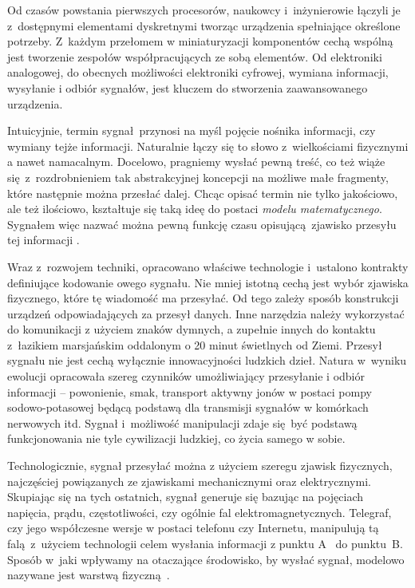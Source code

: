 Od czasów powstania pierwszych procesorów, naukowcy i~inżynierowie łączyli
je z~dostępnymi elementami dyskretnymi tworząc urządzenia spełniające
określone potrzeby. Z~każdym przełomem w miniaturyzacji komponentów
cechą wspólną jest tworzenie zespołów współpracujących ze sobą elementów.
Od elektroniki analogowej, do obecnych możliwości elektroniki cyfrowej,
wymiana informacji, wysyłanie i odbiór sygnałów, jest kluczem do 
stworzenia zaawansowanego urządzenia.

Intuicyjnie, termin sygnał przynosi na myśl pojęcie nośnika informacji, czy wymiany tejże informacji.
Naturalnie łączy się to słowo z~wielkościami fizycznymi a nawet namacalnym. Docelowo, pragniemy wysłać
pewną treść, co też wiąże się z~rozdrobnieniem tak abstrakcyjnej koncepcji na możliwe małe fragmenty,
które następnie można przesłać dalej. Chcąc opisać termin nie tylko jakościowo, ale też ilościowo,
kształtuje się taką ideę do postaci \textit{modelu matematycznego}. Sygnałem więc nazwać można pewną funkcję
czasu opisującą zjawisko przesyłu tej informacji \cite{szabatin_podstawy_2007}.

Wraz z~rozwojem techniki, opracowano właściwe technologie i~ustalono kontrakty definiujące kodowanie
owego sygnału. Nie mniej istotną cechą jest wybór zjawiska fizycznego, które tę wiadomość ma przesyłać.
Od tego zależy sposób konstrukcji urządzeń odpowiadających za przesył danych. Inne narzędzia
należy wykorzystać do komunikacji z użyciem znaków dymnych, a zupełnie innych do kontaktu
z~łazikiem marsjańskim oddalonym o 20 minut świetlnych od Ziemi. Przesył sygnału nie jest cechą
wyłącznie innowacyjności ludzkich dzieł. Natura w~wyniku ewolucji opracowała szereg
czynników umożliwiający przesyłanie i odbiór informacji -- powonienie, smak, transport aktywny jonów
w postaci pompy sodowo-potasowej będącą podstawą dla transmisji sygnałów w komórkach nerwowych itd.
Sygnał i~możliwość manipulacji zdaje się być podstawą funkcjonowania nie tyle cywilizacji ludzkiej,
co życia samego w sobie.

Technologicznie, sygnał przesyłać można z użyciem szeregu zjawisk fizycznych, najczęściej powiązanych 
ze zjawiskami mechanicznymi oraz elektrycznymi. Skupiając się na tych ostatnich, sygnał generuje się
bazując na pojęciach napięcia, prądu, częstotliwości, czy ogólnie fal elektromagnetycznych.
Telegraf, czy jego współczesne wersje w postaci telefonu czy Internetu, manipulują tą falą z~użyciem
technologii celem wysłania informacji z punktu A~ do punktu~B. Sposób w~jaki wpływamy
na otaczające środowisko, by wysłać sygnał, modelowo nazywane jest warstwą fizyczną~\cite{sa_tcpip_nodate}.

